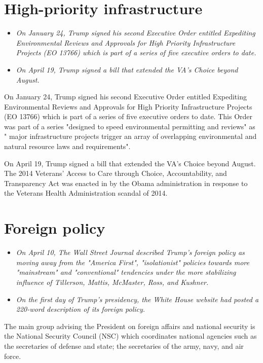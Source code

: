 \section{High-priority
infrastructure}\label{high-priority-infrastructure}

\begin{itemize}
\item
  \emph{On January 24, Trump signed his second Executive Order entitled
  Expediting Environmental Reviews and Approvals for High Priority
  Infrastructure Projects (EO 13766) which is part of a series of five
  executive orders to date.}
\item
  \emph{On April 19, Trump signed a bill that extended the VA's Choice
  beyond August.}
\end{itemize}

On January 24, Trump signed his second Executive Order entitled
Expediting Environmental Reviews and Approvals for High Priority
Infrastructure Projects (EO 13766) which is part of a series of five
executive orders to date. This Order was part of a series "designed to
speed environmental permitting and reviews" as " major infrastructure
projects trigger an array of overlapping environmental and natural
resource laws and requirements".

On April 19, Trump signed a bill that extended the VA's Choice beyond
August. The 2014 Veterans' Access to Care through Choice,
Accountability, and Transparency Act was enacted in by the Obama
administration in response to the Veterans Health Administration scandal
of 2014.

\section{Foreign policy}\label{foreign-policy}

\begin{itemize}
\item
  \emph{On April 10, The Wall Street Journal described Trump's foreign
  policy as moving away from the "America First", "isolationist"
  policies towards more "mainstream" and "conventional" tendencies under
  the more stabilizing influence of Tillerson, Mattis, McMaster, Ross,
  and Kushner.}
\item
  \emph{On the first day of Trump's presidency, the White House website
  had posted a 220-word description of its foreign policy.}
\end{itemize}

The main group advising the President on foreign affairs and national
security is the National Security Council (NSC) which coordinates
national agencies such as the secretaries of defense and state; the
secretaries of the army, navy, and air force.

